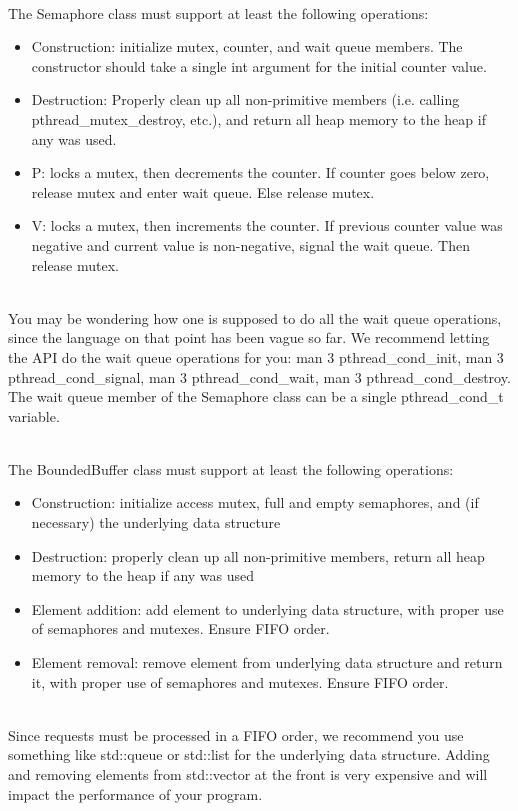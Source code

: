 \documentclass[12pt]{extarticle}
\newenvironment{myindentpar}[1]%
 {\begin{list}{}%
         {\setlength{\leftmargin}{#1}}%
         \item[]%
 }
 {\end{list}}
\begin{document}
\begin{myindentpar}{5mm}
	\ \\
	The Semaphore class must support at least the following operations:
	\begin{itemize}
		\setlength\itemsep{-0.1em}
		\item Construction: initialize mutex, counter, and wait queue members. The constructor should take a single int argument for the initial counter value.
		\item Destruction: Properly clean up all non-primitive members (i.e. calling pthread\_mutex\_destroy, etc.), and return all heap memory to the heap if any was used.
		\item P: locks a mutex, then decrements the counter. If counter goes below zero, release mutex and enter wait queue. Else release mutex.
		\item V: locks a mutex, then increments the counter. If previous counter value was negative and current value is non-negative, signal the wait queue. Then release mutex.
	\end{itemize}

	\ \\
	You may be wondering how one is supposed to do all the wait queue operations, since the language on that point has been vague so far. We recommend letting the API do the wait queue operations for you: man 3 pthread\_cond\_init, man 3 pthread\_cond\_signal, man 3 pthread\_cond\_wait, man 3 pthread\_cond\_destroy. The wait queue member of the Semaphore class can be a single pthread\_cond\_t variable.
	
	\ \\
	The BoundedBuffer class must support at least the following operations:
	\begin{itemize}
		\setlength\itemsep{-0.1em}
		\item Construction: initialize access mutex, full and empty semaphores, and (if necessary) the underlying data structure
		\item Destruction: properly clean up all non-primitive members, return all heap memory to the heap if any was used
		\item Element addition: add element to underlying data structure, with proper use of semaphores and mutexes. Ensure FIFO order.
		\item Element removal: remove element from underlying data structure and return it, with proper use of semaphores and mutexes. Ensure FIFO order.
	\end{itemize}

	\ \\
	Since requests must be processed in a FIFO order, we recommend you use something like std::queue or std::list for the underlying data structure. Adding and removing elements from std::vector at the front is very expensive and will impact the performance of your program.


\end{myindentpar}
\end{document}
